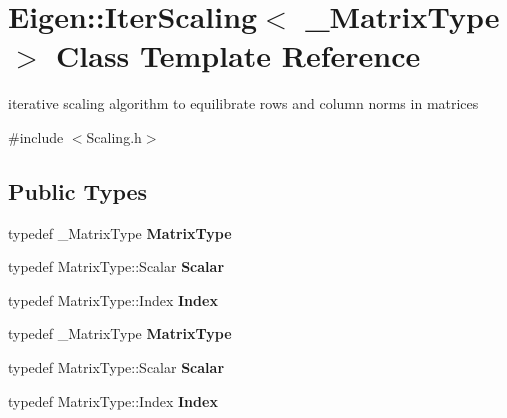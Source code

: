 \hypertarget{class_eigen_1_1_iter_scaling}{}\section{Eigen\+:\+:Iter\+Scaling$<$ \+\_\+\+Matrix\+Type $>$ Class Template Reference}
\label{class_eigen_1_1_iter_scaling}


iterative scaling algorithm to equilibrate rows and column norms in matrices  




{\ttfamily \#include $<$Scaling.\+h$>$}

\subsection*{Public Types}
\begin{DoxyCompactItemize}
\item 
\mbox{\label{class_eigen_1_1_iter_scaling_a17ba75418fe03a6fc6d6666ddcf14a56}} 
typedef \+\_\+\+Matrix\+Type {\bfseries Matrix\+Type}
\item 
\mbox{\label{class_eigen_1_1_iter_scaling_a323507c8d27cec1e0acc3c87140a69c1}} 
typedef Matrix\+Type\+::\+Scalar {\bfseries Scalar}
\item 
\mbox{\label{class_eigen_1_1_iter_scaling_a5c9b5e9c9738f5203f635d414a43645f}} 
typedef Matrix\+Type\+::\+Index {\bfseries Index}
\item 
\mbox{\label{class_eigen_1_1_iter_scaling_a17ba75418fe03a6fc6d6666ddcf14a56}} 
typedef \+\_\+\+Matrix\+Type {\bfseries Matrix\+Type}
\item 
\mbox{\label{class_eigen_1_1_iter_scaling_a323507c8d27cec1e0acc3c87140a69c1}} 
typedef Matrix\+Type\+::\+Scalar {\bfseries Scalar}
\item 
\mbox{\label{class_eigen_1_1_iter_scaling_a5c9b5e9c9738f5203f635d414a43645f}} 
typedef Matrix\+Type\+::\+Index {\bfseries Index}
\end{DoxyCompactItemize}
